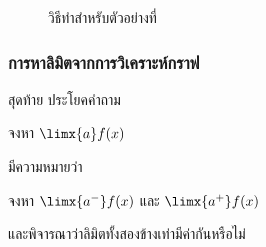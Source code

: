 \begin{frame}
\begin{figure}[h!]
\caption{วิธีทำสำหรับตัวอย่างที่ \theex}
\label{fig:limit_graph_ex2_sol}
\end{figure}
\end{frame}

\begin{frame}
\frametitle{การหาลิมิตจากการวิเคราะห์กราฟ}

สุดท้าย ประโยคคำถาม

\begin{remark}{}
\begin{center}
จงหา $\limx{a} f(x)$
\end{center}
\end{remark}

มีความหมายว่า

\begin{remark}{}
\begin{center}
จงหา $\limx{a^{-}}f(x)$ และ $\limx{a^{+}}f(x)$ 

และพิจารณาว่าลิมิตทั้งสองข้างเท่ามีค่ากันหรือไม่
\end{center}
\end{remark}
\end{frame}

